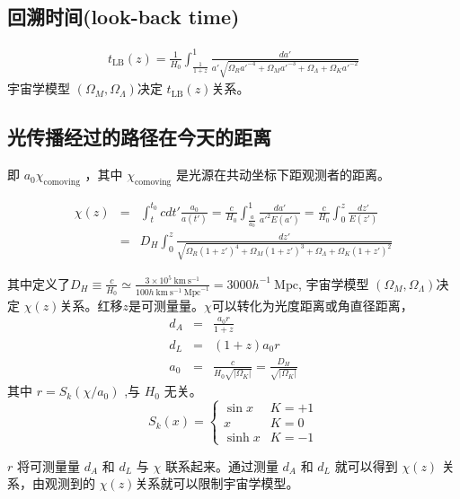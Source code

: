 \documentclass[]{ctexart}
\begin{document}
\subsection{回溯时间(look-back time)}
\begin{eqnarray}
    t_\text{LB}(z)  = \frac{1}{H_0}\int_\frac{1}{1+z}^1 \frac{da'}{a' \sqrt{\Omega_R a'^{-4}+\Omega_M a'^{-3}+\Omega_\Lambda+\Omega_K a'^{-2}}}
\end{eqnarray}
宇宙学模型 $\left(\Omega_M, \Omega_\Lambda\right) $决定 $t_\text{LB}(z)$关系。

\subsection{光传播经过的路径在今天的距离}

即 $a_0 \chi_\text{comoving}$ ，其中 $\chi_\text{comoving}$ 是光源在共动坐标下距观测者的距离。 

\begin{eqnarray}
    \chi(z) &=& \int_t^{t_0} cdt' \frac{a_0}{a(t')} = \frac{c}{H_0}\int_{\frac{a}{a_0}}^1 \frac{da'}{a'^2 E(a')} =\frac{c}{H_0}\int_0^z \frac{dz'}{E(z')} \\ 
    &=&  D_H \int_0^z \frac{dz'}{ \sqrt{\Omega_R(1+z')^{4}+\Omega_M(1+z')^{3}+\Omega_\Lambda+\Omega_K(1+z')^{2} }}
\end{eqnarray}

其中定义了$D_H\equiv\frac{c}{H_0}\simeq\frac{3\times10^5 \mathrm{~km} \mathrm{~s}^{-1}}{100 h \mathrm{~km} \mathrm{~s}^{-1} \mathrm{~Mpc}^{-1}} = 3000 h^{-1}  \mathrm{~Mpc}$,
宇宙学模型 $\left(\Omega_M, \Omega_\Lambda\right) $决定 $\chi(z)$关系。红移$z$是可测量量。$\chi$可以转化为光度距离或角直径距离，
\begin{eqnarray}
    d_A &=& \frac{a_0 r}{1+z}
    \\ d_L &=& (1+z) a_0 r
    \\ a_0 &=& \frac{c}{H_0\sqrt{|\Omega_K|} } = \frac{D_H}{\sqrt{|\Omega_K|}} 
\end{eqnarray}
其中 
$r = S_k(\chi/a_0)$ ,与 $H_0$ 无关。 
\begin{equation}
    S_k(x) = 
    \begin{cases}
        \sin x & K=+1 \\ 
        x & K=0 \\ 
        \sinh x & K=-1
    \end{cases}
\end{equation}

$r$ 将可测量量 $d_A$ 和 $d_L$ 与  $\chi$ 联系起来。通过测量 $d_A$ 和 $d_L$ 就可以得到 $\chi(z)$ 关系，由观测到的 $\chi(z)$关系就可以限制宇宙学模型。
\end{document}
